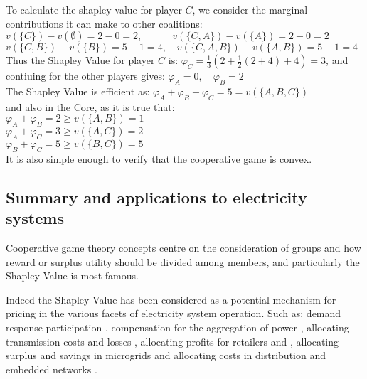 \begin{solution}
To calculate the shapley value for player $C$, we consider the marginal contributions it can make to other coalitions:\\
$ v(\{C\})-v(\emptyset) = 2-0 = 2, \quad\quad\quad v(\{C,A\})-v(\{A\}) = 2-0 = 2$\\
$ v(\{C,B\})-v(\{B\}) = 5-1 = 4, \quad v(\{C,A,B\})-v(\{A,B\}) = 5-1 = 4  $\\
Thus the Shapley Value for player $C$ is:
$\varphi_C = \frac{1}{3}\left(2 + \frac{1}{2}(2+4) + 4\right) = 3$, and contiuing for the other players gives:
$\varphi_A = 0,\quad\varphi_B = 2$\\
The Shapley Value is efficient as: $\varphi_A+\varphi_B+\varphi_C = 5 = v(\{A,B,C\})$\\
and also in the Core, as it is true that:\\
$\varphi_A+\varphi_B=2\ge v(\{A,B\})=1$\\
$\varphi_A+\varphi_C=3\ge v(\{A,C\})=2$\\
$\varphi_B+\varphi_C=5\ge v(\{B,C\})=5$\\
It is also simple enough to verify that the cooperative game is convex.

\end{solution}

\subsection{Summary and applications to electricity systems}

Cooperative game theory concepts centre on the consideration of groups and how reward or surplus utility should be divided among members, and particularly the Shapley Value is most famous.

Indeed the Shapley Value has been considered as a potential mechanism for pricing in the various facets of electricity system operation.
Such as: demand response participation \cite{DBLP:journals/tsg/OBrienGR15,electronics8010048,WANG201972}, compensation for the aggregation of power \cite{Perez-Diaz:2018:CEV:3237383.3237484,6520960}, allocating transmission costs and losses \cite{ip-gtd_20020005,SHARMA201733}, allocating profits for retailers and \cite{ACUNA2018161,WANG201972}, allocating surplus and savings in microgrids \cite{WU2017384} and allocating costs in distribution and embedded networks \cite{archie_paper1,8226810,10.1007/978-3-642-40776-5_19,6840296,DBLP:journals/corr/abs-1903-10965,AzuatalamCV_PowerTech2019}.

